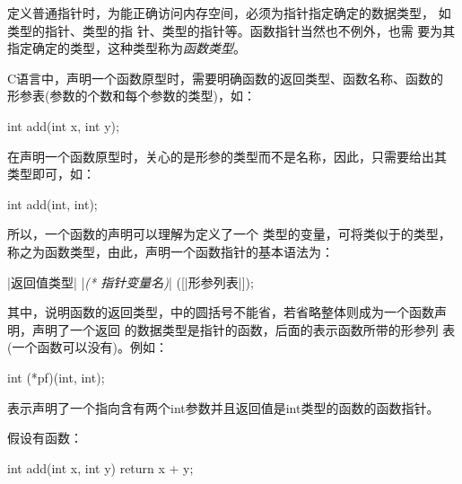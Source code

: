 \documentclass[scheme=chinese, heading = true, UTF8]{ctexart}
\begin{document}
定义普通指针时，为能正确访问内存空间，必须为指针指定确定的数据类型，
如类型的指针、类型的指
针、类型的指针等。函数指针当然也不例外，也需
要为其指定确定的类型，这种类型称为\emph{函数类型}。

C语言中，声明一个函数原型时，需要明确函数的返回类型、函数名称、函数的
形参表(参数的个数和每个参数的类型)，如：

\begin{minipage}[h]{0.6\linewidth}
  \begin{cppcode}
    int add(int x, int y);
  \end{cppcode}
\end{minipage}

在声明一个函数原型时，关心的是形参的类型而不是名称，因此，只需要给出其
类型即可，如：

\begin{minipage}[h]{0.6\linewidth}
  \begin{cppcode}
    int add(int, int);
  \end{cppcode}
\end{minipage}

所以，一个函数的声明可以理解为定义了一个
类型的变量，可将类似于的类型，
称之为函数类型，由此，声明一个函数指针的基本语法为：

\begin{minipage}[h]{0.6\linewidth}
  \begin{cpptt}
    |返回值类型| |\emph{(* 指针变量名)}| ([|形参列表|]);
  \end{cpptt}
\end{minipage}

其中，说明函数的返回类型，中的圆括号不能省，若省略整体则成为一个函数声明，声明了一个返回
的数据类型是指针的函数，后面的表示函数所带的形参列
表(\alert{一个函数可以没有})。例如：

\begin{minipage}[h]{0.6\linewidth}
  \begin{cppcode}
    int (*pf)(int, int);
  \end{cppcode}
\end{minipage}

表示声明了一个指向含有两个int参数并且返回值是int类型的函数的函数指针。

假设有函数：

\begin{minipage}[h]{0.6\linewidth}
  \begin{cppcode}
    int add(int x, int y)
    {
      return x + y;
    }
  \end{cppcode}
\end{minipage}
\end{document}
